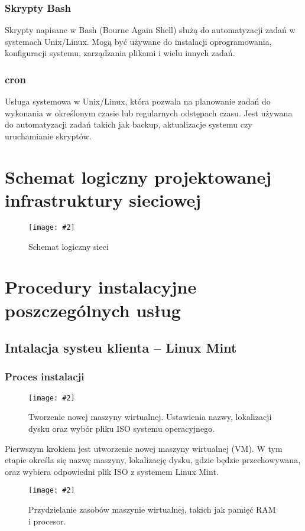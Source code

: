 \documentclass[a4paper]{article}
\newcommand*{\zdj}[2][\textwidth]{\texttt{[image: \#2]}}
\newcommand*{\fg}[4][!htb]{
      \begin{figure*}[#1]
            \zdj{#2}
            \caption[#4]{#3}
      \end{figure*}
}
\begin{document}
\subsubsection{Skrypty Bash}
Skrypty napisane w Bash (Bourne Again Shell) służą do automatyzacji zadań w systemach Unix/Linux. Mogą być używane do instalacji oprogramowania, konfiguracji systemu, zarządzania plikami i wielu innych zadań.

\subsubsection{cron}
Usługa systemowa w Unix/Linux, która pozwala na planowanie zadań do wykonania w określonym czasie lub regularnych odstępach czasu. Jest używana do automatyzacji zadań takich jak backup, aktualizacje systemu czy uruchamianie skryptów.

\section{Schemat logiczny projektowanej infrastruktury sieciowej}
\fg{contents/VirtualBox-network-setup/setup.png}{Schemat logiczny sieci}{Schemat logiczny sieci}
\newpage

\section{Procedury instalacyjne poszczególnych usług}
\subsection{Intalacja systeu klienta – Linux Mint}
\subsubsection{Proces instalacji}

\fg[h]{contents/OS_installation/Linux_mint/1.png}{Tworzenie nowej maszyny wirtualnej. Ustawienia nazwy, lokalizacji dysku oraz wybór pliku ISO systemu operacyjnego.}{Tworzenie nowej maszyny wirtualnej}

Pierwszym krokiem jest utworzenie nowej maszyny wirtualnej (VM). W tym etapie określa się nazwę maszyny, lokalizację dysku, gdzie będzie przechowywana, oraz wybiera odpowiedni plik ISO z systemem Linux Mint.

\fg{contents/OS_installation/Linux_mint/2.png}{Przydzielanie zasobów maszynie wirtualnej, takich jak pamięć RAM i procesor.}{Przydzielanie zasobów maszynie wirtualnej}
\end{document}
